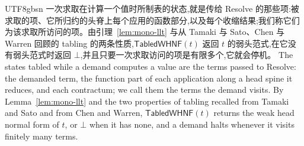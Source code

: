 \begin{CJK*}{UTF8}{gbsn}
  \ifPaperChinese
  一次求取在计算一个值时所制表的状态,就是传给 \textsf{Resolve} 的那些项:被求取的项、它所归约的头脊上每个应用的函数部分,以及每个收缩结果;我们称它们为该求取所访问的项。由引理~\ref{lem:mono-llt} 与从 Tamaki 与 Sato、Chen 与 Warren 回顾的 tabling 的两条性质,$\textsf{TabledWHNF}(t)$ 返回 $t$ 的弱头范式,在它没有弱头范式时返回 $\bot$,并且只要一次求取访问的项是有限多个,它就会停机。
  \else
  The states tabled while a demand computes a value are the terms passed to \textsf{Resolve}: the demanded term, the function part of each application along a head spine it reduces, and each contractum; we call them the terms the demand visits. By Lemma~\ref{lem:mono-llt} and the two properties of tabling recalled from Tamaki and Sato and from Chen and Warren, $\textsf{TabledWHNF}(t)$ returns the weak head normal form of $t$, or $\bot$ when it has none, and a demand halts whenever it visits finitely many terms.
  \fi


\end{CJK*}
